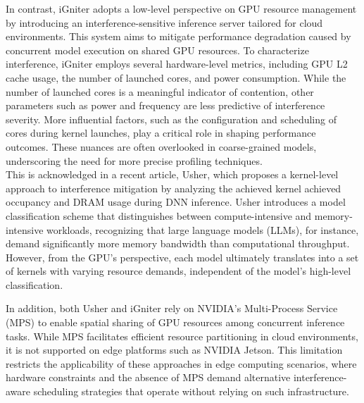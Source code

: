 In contrast, iGniter adopts a low-level perspective on GPU resource management by introducing an interference-sensitive inference server tailored for cloud environments. This system aims to mitigate performance degradation caused by concurrent model execution on shared GPU resources. To characterize interference, iGniter employs several hardware-level metrics, including GPU L2 cache usage, the number of launched cores, and power consumption. While the number of launched cores is a meaningful indicator of contention, other parameters such as power and frequency are less predictive of interference severity. More influential factors, such as the configuration and scheduling of cores during kernel launches, play a critical role in shaping performance outcomes. These nuances are often overlooked in coarse-grained models, underscoring the need for more precise profiling techniques.\\
This is acknowledged in a recent article, Usher, which proposes a kernel-level approach to interference mitigation by analyzing the achieved kernel achieved occupancy and DRAM usage during DNN inference. Usher introduces a model classification scheme that distinguishes between compute-intensive and memory-intensive workloads, recognizing that large language models (LLMs), for instance, demand significantly more memory bandwidth than computational throughput. However, from the GPU's perspective, each model ultimately translates into a set of kernels with varying resource demands, independent of the model's high-level classification.

In addition, both Usher and iGniter rely on NVIDIA's Multi-Process Service (MPS) to enable spatial sharing of GPU resources among concurrent inference tasks. While MPS facilitates efficient resource partitioning in cloud environments, it is not supported on edge platforms such as NVIDIA Jetson. This limitation restricts the applicability of these approaches in edge computing scenarios, where hardware constraints and the absence of MPS demand alternative interference-aware scheduling strategies that operate without relying on such infrastructure.










